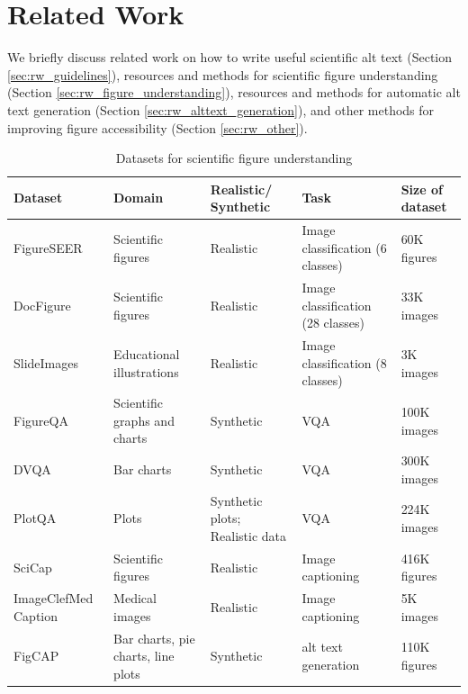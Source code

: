 \documentclass[sigconf]{acmart}
\begin{document}
\section{Related Work}
\label{sec:related}
 
We briefly discuss related work on how to write useful scientific alt text (Section \ref{sec:rw_guidelines}), resources and methods for scientific figure understanding (Section \ref{sec:rw_figure_understanding}), resources and methods for automatic alt text generation (Section \ref{sec:rw_alttext_generation}), and other methods for improving figure accessibility (Section \ref{sec:rw_other}).

\begin{table}[tb!]
\begin{tabular}{L{38mm}L{25mm}L{22mm}L{27mm}l}
    \toprule
    \textbf{Dataset} & \textbf{Domain} & \textbf{Realistic/ Synthetic} & \textbf{Task} & \textbf{Size of dataset} \\
    \midrule

    FigureSEER \cite{Siegel2016FigureSeerPR} & Scientific figures & Realistic & Image classification (6 classes) & 60K figures \\
    DocFigure \cite{Jobin2019DocFigureAD} & Scientific figures & Realistic & Image classification (28 classes) & 33K images \\
    SlideImages \cite{Morris2020SlideImagesAD} & Educational illustrations & Realistic & Image classification (8 classes) & 3K images \\
    \midrule

    FigureQA \cite{Kahou2018FigureQAAA} & Scientific graphs and charts & Synthetic & VQA & 100K images \\
    DVQA \cite{Kafle2018DVQAUD} & Bar charts & Synthetic & VQA & 300K images \\
    PlotQA \citep{Methani2020PlotQARO} & Plots & Synthetic plots; Realistic data & VQA & 224K images \\
    \midrule

    SciCap \cite{Hsu2021SciCapGC} & Scientific figures & Realistic & Image captioning & 416K figures \\
    ImageClefMed Caption \cite{Nicolson2021AEHRCCA} & Medical images & Realistic & Image captioning & 5K images \\
    \midrule

    FigCAP \cite{Chen2019NeuralCG, Chen2019FigureCW} & Bar charts, pie charts, line plots & Synthetic & alt text generation & 110K figures \\
    \bottomrule
\end{tabular}
\caption{Datasets for scientific figure understanding}
\label{tab:datasets}
\end{table}
\end{document}

